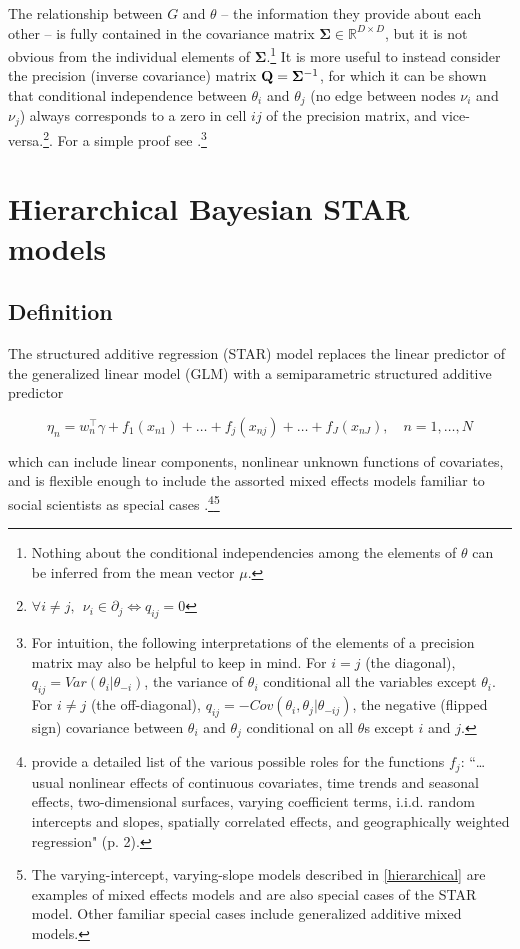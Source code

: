The relationship between $G$ and $\theta$ -- the information they provide about each other -- is fully 
contained in the covariance matrix $\boldsymbol{\Sigma} \in \mathbb{R}^{D\times D}$, but it is not 
obvious from the individual elements of $\boldsymbol{\Sigma}$.\footnote{Nothing about the conditional 
independencies among the elements of $\theta$ can be inferred from the mean vector $\mu$.} It is 
more useful to instead consider the precision (inverse covariance) matrix 
$\mathbf{Q} =\boldsymbol{\Sigma}^{-1}$, for which it can be shown that conditional independence between 
$\theta_i$ and $\theta_j$ (no edge between nodes $\nu_i$ and $\nu_j$) always corresponds to a zero in 
cell $ij$ of the precision matrix, and vice-versa.\footnote{$\forall i \neq j, \:\: \nu_i \in \partial_j \iff q_{ij} = 0$}.  
For a simple proof see .\footnote{For intuition, the following interpretations of 
the elements of a precision matrix may also be helpful to keep in mind. For $i = j$ (the diagonal),  
$q_{ij} = Var(\theta_i | \theta_{-i})$, the variance of $\theta_i$ conditional all the variables except 
$\theta_i$. For $i \neq j$ (the off-diagonal), $q_{ij}  = -Cov(\theta_i, \theta_j | \theta_{-ij}) $, the negative 
(flipped sign) covariance between $\theta_i$ and $\theta_j$ conditional on all $\theta$s except $i$ and $j$.  }






\section{Hierarchical Bayesian STAR models}
\label{star}

\subsection{Definition}

The structured additive regression (STAR) model replaces the linear predictor of the generalized linear 
model (GLM) with a semiparametric structured additive predictor

\begin{equation*}
  \eta_n =  w_n^\intercal\gamma + f_1(x_{n1}) + \ldots + f_j(x_{nj}) + \ldots + f_J(x_{nJ}), \quad n = 1, \dots, N 
\end{equation*}

\noindent which can include linear components, nonlinear unknown functions of covariates, 
and is flexible enough to include the assorted mixed effects models familiar to social scientists as 
special cases .\footnote{ provide a detailed
list of the various possible roles for the functions $f_j$: ``\dots usual nonlinear effects of continuous covariates, time trends and seasonal effects, two-dimensional surfaces, varying coefficient terms, i.i.d. random intercepts and slopes, spatially correlated effects, and geographically weighted regression" (p. 2). }\footnote{The varying-intercept, varying-slope models described in \ref{hierarchical} are examples of mixed effects models and are also special cases of the STAR model. Other familiar special cases include generalized additive mixed models.} 

